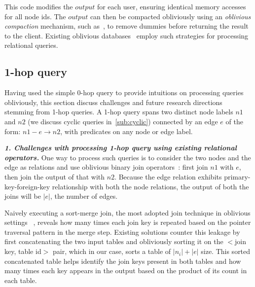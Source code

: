 This code modifies the $output$ for each user, ensuring identical 
memory accesses for all node ids. The $output$ can then be 
compacted obliviously using an \textit{oblivious compaction} 
mechanism, such as~\cite{goodrich2011data, sasy2022fast}, to remove dummies before 
returning the result to the client.
Existing oblivious 
databases~\cite{eskandarian2019oblidb, zheng2017opaque, mavrogiannakis2025obliviator, krastnikov2020efficient} employ 
such strategies for processing relational queries. 

\subsection{1-hop query}

Having used the simple 0-hop query to provide intuitions on processing queries
obliviously, this section discuss challenges and future research directions
stemming from 1-hop queries. A 1-hop query spans two distinct node labels $n1$ and $n2$ (we discuss cyclic queries in~\cref{sub:cyclic})
connected by an edge $e$ of the form: $n1 - e \rightarrow n2$, with predicates on any node
or edge label.

\noindent\textit{\textbf{1. Challenges with processing 1-hop query using
existing relational operators.}} One way to process such queries is to consider the two nodes and the edge as relations and use 
oblivious binary join operators~\cite{mavrogiannakis2025obliviator,krastnikov2020efficient, eskandarian2019oblidb,zheng2017opaque}: first join $n1$ with $e$, then join the
output of that with $n2$. Because the edge relation exhibits primary-key-foreign-key relationship with both the node relations, the output of both the joins will
be $|e|$, the number of edges. 

Naively executing a sort-merge join, the most adopted join technique in oblivious settings
~\cite{zheng2017opaque, eskandarian2019oblidb, krastnikov2020efficient, mavrogiannakis2025obliviator},
reveals how many times each join key is repeated based on the pointer traversal pattern 
in the merge step. Existing solutions counter this leakage by first concatenating the two 
input tables and obliviously sorting it on the $<$join key, table id$>$ pair, which in our case, sorts a table of $|n_i| + |e|$ size. This sorted concatenated table
helps identify the join keys present in both tables and how many times each key appears in
the output based on the product of its count in each table.

